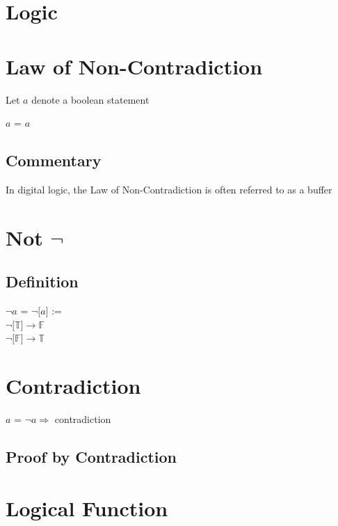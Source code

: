 \documentclass[11pt]{article}
\begin{document}
\section*{Logic}



\section{Law of Non-Contradiction}
Let $a$ denote a boolean statement
\begin{center}
$a$ = $a$
\end{center}
\subsection{Commentary}
In digital logic, the Law of Non-Contradiction is often referred to as a buffer




\section{Not $\lnot$}
\subsection{Definition}
\begin{center}
$\lnot a$ = $\lnot \lbrack a \rbrack$ :=\\
\vspace{2mm}
$\lnot \lbrack \mathbb{T} \rbrack \rightarrow \mathbb{F}$\\
\vspace{2mm}
$\lnot \lbrack \mathbb{F} \rbrack \rightarrow \mathbb{T}$
\end{center}





\section{Contradiction}
\begin{center}
$a$ = $\lnot a \Rightarrow$ contradiction
\end{center}
\subsection{Proof by Contradiction}





\section{Logical Function}
\end{document}
